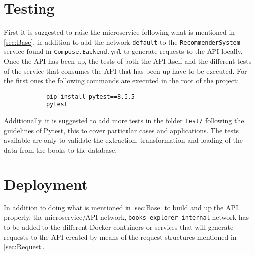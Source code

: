 \documentclass[12pt,a4paper]{article}
\begin{document}
    \section{Testing}
    {
        First it is suggested to raise the microservice following what is mentioned in \ref{sec:Base}, 
        in addition to add the network \verb*|default| to the \verb*|RecommenderSystem| service found 
        in \verb*|Compose.Backend.yml| to generate requests to the API locally.\\

        Once the API has been up, the tests of both the API itself and the different tests of the 
        service that consumes the API that has been up have to be executed. For the first ones the 
        following commands are executed in the root of the project:

        \begin{verbatim}
            pip install pytest==8.3.5
            pytest
        \end{verbatim}

        Additionally, it is suggested to add more tests in the folder \verb*|Test/| following the guidelines 
        of \href{https://docs.pytest.org/en/stable/}{Pytest}, this to cover particular cases and applications. 
        The tests available are only to validate the extraction, transformation and loading of the data 
        from the books to the database.
    }

    \newpage

    \section{Deployment}
    {
        In addition to doing what is mentioned in \ref{sec:Base} to build and up the API properly, 
        the microservice/API network, \verb*|books_explorer_internal| network has to be added to 
        the different Docker containers or services that will generate requests to the API created 
        by means of the request structures mentioned in \ref{sec:Request}.
    }
\end{document}
